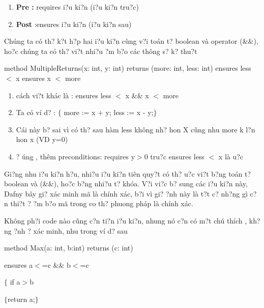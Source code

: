 \documentclass{article} %
\begin{document}
\begin{enumerate}
\item  \textbf{Pre : }requires {\dj}i?u ki?n  ({\DJ}i?u ki?n tru?c)

\item  \textbf{Post} :ensures {\dj}i?u ki?n ({\DJ}i?u ki?n sau) 
\end{enumerate}

Ch\'{u}ng ta c\'{o} th? k?t h?p hai {\dj}i?u ki?n c\`{u}ng v?i to\'{a}n t? boolean v\`{a} operator (\&\&), ho?c ch\'{u}ng ta c\'{o} th? vi?t nhi?u {\dj}?m b?o c\'{a}c th\^{o}ng s? k? thu?t 

\noindent method MultipleReturns(x: int, y: int) returns (more: int, less: int)    ensures less $<$ x   ensures x $<$ more

\begin{enumerate}
\item  c\'{a}ch vi?t kh\'{a}c l\`{a} : ensures less $<$ x \&\& x $<$ more

\item  Ta c\'{o} v\'{i} d? : $\{$   more := x + y;   less := x - y;$\}$

\item  C\'{a}i n\`{a}y b? sai v\`{i} c\'{o} th? sau h\`{a}m less kh\^{o}ng nh? hon X c\~{u}ng nhu more k l?n hon x (VD y=0)

\item  {\dj}? {\dj}\'{u}ng , th\^{e}m preconditions:  requires y$>$0 tru?c ensures less $<$ x l\`{a} {\dj}u?c
\end{enumerate}

Gi?ng nhu {\dj}i?u ki?n h?u, nhi?u {\dj}i?u ki?n ti\^{e}n quy?t c\'{o} th? {\dj}u?c vi?t b?ng to\'{a}n t? boolean v\`{a} (\&\&), ho?c b?ng nhi?u t? kh\'{o}a.  V?i vi?c b? sung c\'{a}c {\dj}i?u ki?n n\`{a}y, Dafny b\^{a}y gi? x\'{a}c minh m\~{a} l\`{a} ch\'{i}nh x\'{a}c, b?i v\`{i} gi? {\dj}?nh n\`{a}y l\`{a} t?t c? nh?ng g\`{i} c?n thi?t {\dj}? {\dj}?m b?o m\~{a} trong co th? phuong ph\'{a}p l\`{a} ch\'{i}nh x\'{a}c.

\noindent Kh\^{o}ng ph?i code n\`{a}o c\~{u}ng c?n ti?n {\dj}i?u ki?n, nhung n\'{o} c?n c\'{o} m?t ch\'{u}       th\'{i}ch , kh?ng {\dj}?nh {\dj}? x\'{a}c minh, nhu trong v\'{i} d? sau 

\noindent method Max(a: int, b:int) returns (c: int)

\noindent    ensures a$<$=c \&\& b$<$=c 

\noindent $\{$ if a$>$b

\noindent   $\{$return a;$\}$
\end{document}

